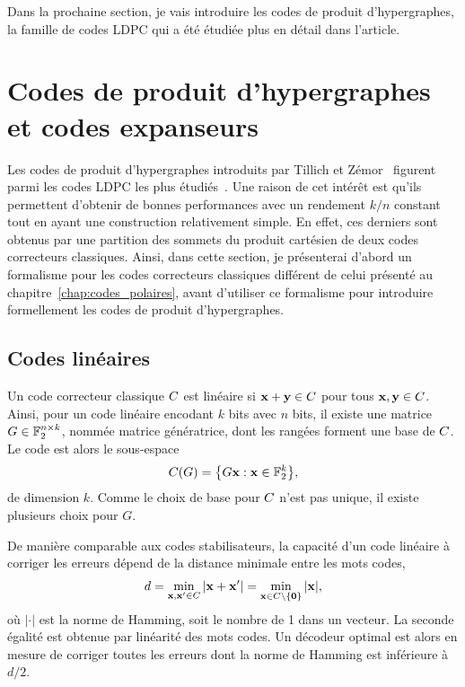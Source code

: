 Dans la prochaine section,
je vais introduire les codes de produit d'hypergraphes, 
la famille de codes LDPC qui a été étudiée plus en détail dans l'article.

\section{Codes de produit d'hypergraphes et codes expanseurs}

Les codes de produit d'hypergraphes introduits par Tillich et Zémor~\cite{tillich_quantum_2014}
figurent parmi les codes LDPC les plus étudiés~\cite{grospellier_combining_2020, grospellier_numerical_2018, leverrier_quantum_2015, kovalev_improved_2012, kovalev_numerical_2018}.
Une raison de cet intérêt est qu'ils permettent d'obtenir de bonnes performances 
avec un rendement $k/n$ constant tout en ayant une construction relativement simple.
En effet,
ces derniers sont obtenus par une partition des sommets du produit cartésien de
deux codes correcteurs classiques.
Ainsi,
dans cette section,
je présenterai d'abord un formalisme pour les codes correcteurs classiques
différent de celui présenté au chapitre~\ref{chap:codes_polaires},
avant d'utiliser ce formalisme pour introduire formellement les codes
de produit d'hypergraphes.

\subsection{Codes linéaires}

Un code correcteur classique $C$ est linéaire si $\vb x + \vb y \in C$ 
pour tous $\vb x, \vb y \in C$.
Ainsi,
pour un code linéaire encodant $k$ bits avec $n$ bits,
il existe une matrice $G \in \mathbb{F}_{2}^{n \times k}$,
nommée matrice génératrice,
dont les rangées forment une base de $C$.
Le code est alors le sous-espace
\begin{align}
	C(G) = \qty{
		G \vb x : \vb x \in \mathbb{F}_{2}^k
	},
\end{align}
de dimension $k$.
Comme le choix de base pour $C$ n'est pas unique,
il existe plusieurs choix pour $G$.

De manière comparable aux codes stabilisateurs,
la capacité d'un code linéaire à corriger les erreurs dépend de la distance minimale entre 
les mots codes,
\begin{align}
	d = \min_{\vb x, \vb x' \in C} | \vb x + \vb x'| = \min_{\vb x \in C \setminus \qty{\vb 0}} |\vb x|,
\end{align}
où $|\cdot|$ est la norme de Hamming, soit le nombre de 1 dans un vecteur.
La seconde égalité est obtenue par linéarité des mots codes.
Un décodeur optimal est alors en mesure de corriger toutes les erreurs dont la norme de Hamming
est inférieure à $d/2$.

